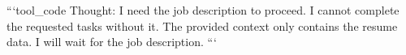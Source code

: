 ```tool_code
Thought: I need the job description to proceed.  I cannot complete the requested tasks without it.  The provided context only contains the resume data. I will wait for the job description.
```